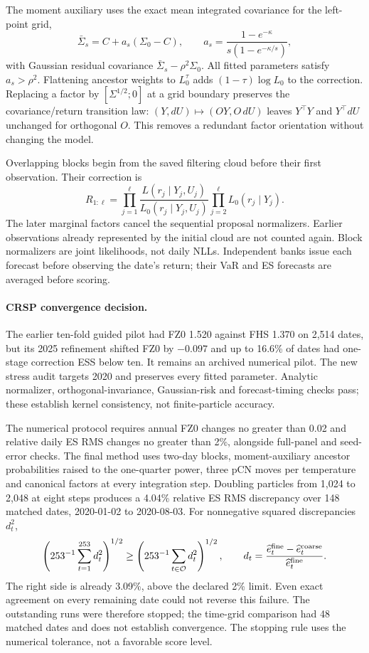 \documentclass[11pt]{article}
\theoremstyle{definition}\newtheorem{definition}[theorem]{Definition}
\theoremstyle{remark}\newtheorem{remark}[theorem]{Remark}
\begin{document}
The moment auxiliary uses the exact mean integrated covariance for the left-point grid,
\[
 \bar\Sigma_s=C+a_s(\Sigma_0-C),\qquad
 a_s=\frac{1-e^{-\kappa}}{s(1-e^{-\kappa/s})},
\]
with Gaussian residual covariance $\bar\Sigma_s-\rho^2\Sigma_0$. All fitted parameters satisfy $a_s>\rho^2$. Flattening ancestor weights to $L_0^\tau$ adds $(1-\tau)\log L_0$ to the correction. Replacing a factor by $[\Sigma^{1/2};0]$ at a grid boundary preserves the covariance/return transition law: $(Y,dU)\mapsto(OY,O\,dU)$ leaves $Y^\top Y$ and $Y^\top dU$ unchanged for orthogonal $O$. This removes a redundant factor orientation without changing the model.

Overlapping blocks begin from the saved filtering cloud before their first observation. Their correction is
\[
 R_{1:\ell}=\prod_{j=1}^{\ell}\frac{L(r_j\mid Y_j,U_j)}{L_0(r_j\mid Y_j,U_j)}
             \prod_{j=2}^{\ell}L_0(r_j\mid Y_j).
\]
The later marginal factors cancel the sequential proposal normalizers. Earlier observations already represented by the initial cloud are not counted again. Block normalizers are joint likelihoods, not daily NLLs. Independent banks issue each forecast before observing the date's return; their VaR and ES forecasts are averaged before scoring.

\paragraph{CRSP convergence decision.}
The earlier ten-fold guided pilot had FZ0 1.520 against FHS 1.370 on 2,514 dates, but its 2025 refinement shifted FZ0 by $-0.097$ and up to 16.6\% of dates had one-stage correction ESS below ten. It remains an archived numerical pilot. The new stress audit targets 2020 and preserves every fitted parameter. Analytic normalizer, orthogonal-invariance, Gaussian-risk and forecast-timing checks pass; these establish kernel consistency, not finite-particle accuracy.

The numerical protocol requires annual FZ0 changes no greater than 0.02 and relative daily ES RMS changes no greater than 2\%, alongside full-panel and seed-error checks. The final method uses two-day blocks, moment-auxiliary ancestor probabilities raised to the one-quarter power, three pCN moves per temperature and canonical factors at every integration step. Doubling particles from 1,024 to 2,048 at eight steps produces a 4.04\% relative ES RMS discrepancy over 148 matched dates, 2020-01-02 to 2020-08-03. For nonnegative squared discrepancies $d_t^2$,
\[\left(253^{-1}\sum_{t=1}^{253}d_t^2\right)^{1/2}\ge\left(253^{-1}\sum_{t\in\mathcal O}d_t^2\right)^{1/2},\qquad d_t=\frac{\widehat e_t^{\rm fine}-\widehat e_t^{\rm coarse}}{\widehat e_t^{\rm fine}}.\]
The right side is already 3.09\%, above the declared 2\% limit. Even exact agreement on every remaining date could not reverse this failure. The outstanding runs were therefore stopped; the time-grid comparison had 48 matched dates and does not establish convergence. The stopping rule uses the numerical tolerance, not a favorable score level.
\end{document}
